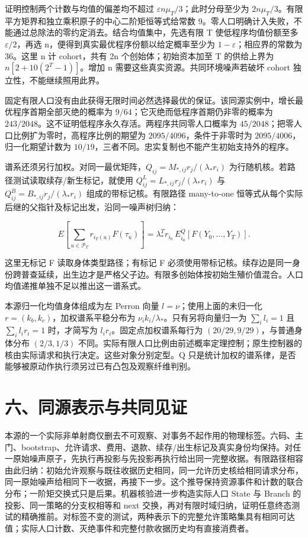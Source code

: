 \documentclass[
  11pt,
  oneside]{book}
\begin{document}
证明控制两个计数与均值的偏差均不超过 \(\varepsilon n\mu_T/3\)；此时分母至少为 \(2n\mu_T/3\)。有限平方矩界和独立乘积原子的中心二阶矩恒等式给常数 9。零人口明确计入失败，不能通过总除法的零约定消去。结合均值集中，先选有限 T 使低程序均值份额至多 \(\varepsilon/2\)，再选 n，便得到真实最优程序份额以给定概率至少为 \(1-\varepsilon\)；相应界的常数为 36。这里 n 计 cohort，共有 2n 个创始体；初始资本加至 T 的供给上界为 \(n[2+10(2^T-1)]\)。增加 n 需要这些真实资源。共同环境噪声若破坏 cohort 独立性，不能继续照用此界。

固定有限人口没有由此获得无限时间必然选择最优的保证。该同源实例中，增长最优程序首期全部灭绝的概率为 \(9/64\)；它灭绝而低程序首期仍非零的概率为 \(243/2048\)。这不证明低程序永久存活。两程序共同零人口概率为 \(45/2048\)；把零人口比例扩为零时，高程序比例的期望为 \(2095/4096\)，条件于非零时为 \(2095/4006\)，归一化期望计数为 \(10/19\)，三者不同。忠实复制也不能产生初始支持外的程序。

谱系还须另行加权。对同一最优矩阵，\(Q_{ij}=M_{*,ij}r_j/(\lambda_*r_i)\) 为行随机核。若路径测试读取续存/新生标记，就使用 \(Q^L_{ij}=L_{*,ij}r_j/(\lambda_*r_i)\) 与 \(Q^B_{ij}=B_{*,ij}r_j/(\lambda_*r_i)\) 组成的带标记核。有限路径 many-to-one 恒等式从每个实际后继的父指针及标记出发，沿同一噪声树归纳：

\[E\!\left[\sum_{u\in\mathcal P_T}r_{i_T(u)}F(\tau_u)\right]
=\lambda_*^T r_{i_0}\,E^Q_{i_0}[F(Y_0,\ldots,Y_T)].\]

这里无标记 F 读取身体类型路径；有标记 F 必须使用带标记核。续存边是同一身份跨普查延续，出生边才是严格父子边。有限多创始体按初始生殖价值混合。人口均值递推单独不足以推出这一谱系式。

本源归一化均值身体组成为左 Perron 向量 \(l=\nu\)；使用上面的未归一化 \(r=(k_b,k_c)\)，加权谱系平稳分布为 \(\nu_i k_i/\lambda_*\)。只有另将向量归一为 \(\sum_i l_i=1\) 且 \(\sum_i l_ir_i=1\) 时，才简写为 \(l_ir_i\)。固定点加权谱系每行为 \((20/29,9/29)\)，与普通身体分布 \((2/3,1/3)\) 不同。实际有限人口比例由前述概率定理控制；原生控制器的核由实际请求和执行决定。这些对象分别定型。Q 只是统计加权的谱系律，是否能够被原动作执行须另过已有凸包及观察纤维判别。

\section{六、同源表示与共同见证}\label{ux516dux540cux6e90ux8868ux793aux4e0eux5171ux540cux89c1ux8bc1}

本源的一个实际非单射商仅删去不可观察、对事务不起作用的物理标签。六码、主门、bootstrap、允许请求、费用、退款、续存/出生标记及真实身份均保持。对任一原始噪声原子，先执行再投影与先投影再执行给出同一完整收据。有限路径相容由此归纳：初始允许观察与既往收据历史相同，同一允许历史核给相同请求分布，同一原始噪声给相同下一收据，再接下一步。这个推导保持资源事件和计数的联合分布；一阶矩交换式只是后果。机器核验进一步构造实际人口 State 与 Branch 的投影、同一策略的分支权相等和 next 交换，再对有限时域归纳，证明任意终态测试的精确推前。对标签不变的测试，两种表示下的完整允许策略集具有相同可达值；实际人口计数、灭绝事件和完整付款收据历史均有直接消费者。
\end{document}
